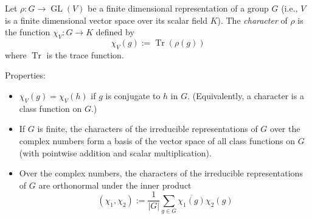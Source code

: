 \documentclass[12pt]{article}
\begin{document}
Let $\rho: G \longrightarrow \operatorname{GL}(V)$ be a finite dimensional representation of a group $G$ (i.e., $V$ is a finite dimensional vector space over its scalar field $K$). The {\em character} of $\rho$ is the function $\chi_V: G \longrightarrow K$ defined by
$$
\chi_V(g) := \operatorname{Tr}(\rho(g))
$$
where $\operatorname{Tr}$ is the trace function.

Properties:
\begin{itemize}
\item $\chi_V(g) = \chi_V(h)$ if $g$ is conjugate to $h$ in $G$. (Equivalently, a character is a class function on $G$.)
\item If $G$ is finite, the characters of the irreducible representations of $G$ over the complex numbers form a basis of the vector space of all class functions on $G$ (with pointwise addition and scalar multiplication).
\item Over the complex numbers, the characters of the irreducible representations of $G$ are orthonormal under the inner product
$$
(\chi_1, \chi_2) := \frac{1}{|G|} \sum_{g \in G} \overline{\chi_1(g)} \chi_2(g)
$$
\end{itemize}
\end{document}
